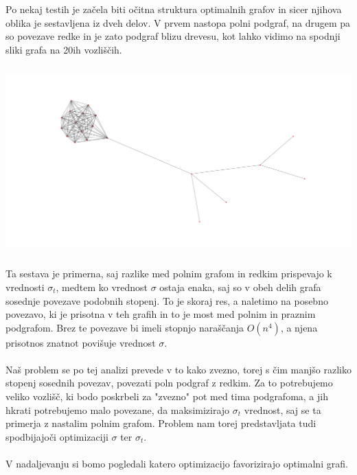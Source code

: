 \documentclass[ letterpaper, titlepage, fleqn]{article}
\begin{document}
Po nekaj testih je začela biti očitna struktura optimalnih grafov in sicer
njihova oblika je sestavljena iz dveh delov. V prvem nastopa polni podgraf, 
na drugem pa so povezave redke in je zato podgraf blizu drevesu, kot lahko 
vidimo na spodnji sliki grafa na 20ih vozliščih. \\
\includegraphics[width=\textwidth, height=8cm]{graphics/sample.png} \\
Ta sestava je primerna, saj razlike med polnim grafom in redkim prispevajo 
k vrednosti $\sigma_t$, medtem ko vrednost $\sigma$ ostaja enaka, saj so v obeh
delih grafa sosednje povezave podobnih stopenj. To je skoraj res, a naletimo na posebno povezavo,
ki je prisotna v teh grafih in to je most med polnim in praznim podgrafom. Brez te povezave
bi imeli stopnjo naraščanja $O(n^4)$, a njena prisotnos znatnot povišuje vrednost $\sigma$.
\\\\
Naš problem se po tej analizi prevede v to kako zvezno, torej s čim manjšo razliko stopenj sosednih povezav, 
povezati poln podgraf z redkim. 
Za to potrebujemo veliko vozlišč, ki bodo poskrbeli za "zvezno" pot med tima podgrafoma,  
a jih hkrati potrebujemo malo povezane, da maksimizirajo $\sigma_t$ vrednost, saj se ta primerja
z nastalim polnim grafom. Problem nam torej predstavljata tudi spodbijajoči optimizaciji $\sigma$ ter $\sigma_t$.
\\\\
V nadaljevanju si bomo pogledali katero optimizacijo favorizirajo optimalni grafi.
\end{document}
